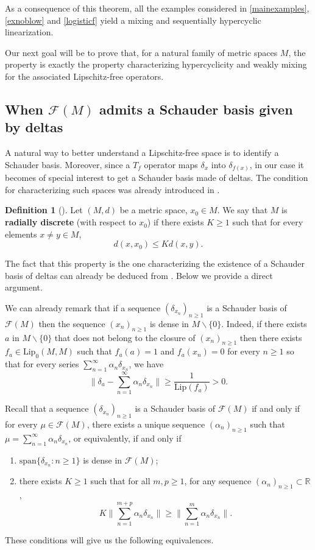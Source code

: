 \documentclass[12pt,english]{amsart}
\numberwithin{equation}{section}
\theoremstyle{plain}
\theoremstyle{definition}
\newtheorem{definition}[theorem]{Definition}
\def\RR{\mathbb{R}}
\def\aa{\alpha}
\def\dd{\delta}
\def\aim{\text{targeting}{}}
\def\lip{ \text{Lip}}
\begin{document}
As a consequence of this theorem, all the examples considered in \ref{mainexamples}, \ref{exnoblow} and \ref{logisticf} yield a mixing and sequentially hypercyclic linearization. 

Our next goal will be to prove that, for a natural family of metric spaces $M$, the \aim{} property is exactly the property characterizing hypercyclicity and weakly mixing for the associated Lipschitz-free operators.

\subsection{When $\mathcal{F}(M)$ admits a Schauder basis given by deltas}

A natural way to better understand a Lipschitz-free space is to identify a Schauder basis. Moreover, since a $T_f$ operator maps $\dd_x$ into $\dd_{f(x)}$, in our case it becomes of special interest to get a Schauder basis made of deltas. The condition for characterizing such spaces was already introduced in \cite{AlPer23}.

\begin{definition}[{\cite[Definition 6.2]{AlPer23}}] Let $(M,d)$ be a metric space, $x_0\in M$. We say that $M$ is \textbf{radially discrete} (with respect to $x_0$) if there exists $K\geq 1$ such that for every elements $x\neq y\in M$,
\[d(x,x_0)\leq Kd(x,y).\]
\end{definition}

The fact that this property is the one characterizing the existence of a Schauder basis of deltas can already be deduced from  \cite[Theorem 6.2]{AlPer23}. Below we provide a direct argument.



We can already remark that if a sequence $(\delta_{x_n})_{n\ge 1}$ is a Schauder basis of $\mathcal{F}(M)$ then the sequence $(x_n)_{n\ge 1}$ is dense in $M\backslash\{0\}$. Indeed, if there exists $a$ in $M\backslash\{0\}$ that does not belong to the closure of $(x_n)_{n\ge 1}$ then there exists $f_a\in \lip_0(M,M)$ such that $f_a(a)=1$ and $f_a(x_n)=0$ for every $n\ge 1$ so that for every series $\sum_{n=1}^{\infty}\aa_n \delta_{x_n}$, we have
\[\|\delta_a-\sum_{n=1}^{\infty}\aa_n \delta_{x_n}\|\ge \frac{1}{\text{Lip}(f_a)}>0.\]

Recall that a sequence $(\delta_{x_n})_{n\ge 1}$ is a Schauder basis of $\mathcal{F}(M)$ if and only if for every $\mu\in \mathcal{F}(M)$, there exists a unique sequence $(\aa_n)_{n\ge 1}$ such that $\mu= \sum_{n=1}^{\infty}\aa_n \delta_{x_n}$, or equivalently, if and only if
\begin{enumerate}
\item $\text{span}\{\delta_{x_n}:n\ge 1\}$ is dense in $\mathcal{F}(M)$;
\item there exists $K\ge 1$ such that for all $m,p\ge 1$, for any sequence $(\aa_n)_{n\ge 1}\subset \RR$,
\[K \|\sum_{n=1}^{m+p}\aa_n \delta_{x_n}\|\ge \|\sum_{n=1}^{m}\aa_n \delta_{x_n}\|.\]
\end{enumerate}
These conditions will give us the following equivalences.
\end{document}
